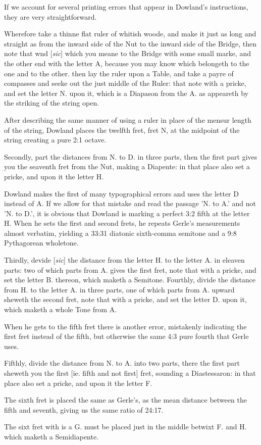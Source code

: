If we account for several printing errors that appear in Dowland's instructions, they
are very straightforward.
\begin{blocks}
Wherefore take a thinne flat ruler of whitish woode, and make it just as long and
straight as from the inward side of the Nut to the inward side of the Bridge, then note
that wnd [\textit{sic}] which you meane to the Bridge with some small marke, and the other end with
the letter A, because you may know which belongeth to the one and to the other. then
lay the ruler upon a Table, and take a payre of compasses and seeke out the just middle
of the Ruler: that note with a pricke, and set the letter N. upon it, which is a
Diapason from the A. as appeareth by the striking of the string open.
\end{blocks}
After describing the same manner of using a ruler in place of the mensur length of the
string, Dowland places the twelfth fret, fret N, at the midpoint of the string creating
a pure 2:1 octave.
\begin{blocks}
Secondly, part the distances from N. to D. in three parts, then the first part gives
you the seaventh fret from the Nut, making a Diapente: in that place also set a pricke,
and upon it the letter H.
\end{blocks}
Dowland makes the first of many typographical errors and uses the letter D instead of
A. If we allow for that mistake and read the passage 'N. to A.' and not 'N. to D.', it
is obvious that Dowland is marking a perfect 3:2 fifth at the letter H.  When he sets
the first and second frets, he repeats Gerle's measurements almost verbatim, yielding a
33:31 diatonic sixth-comma semitone and a 9:8 Pythagorean wholetone.
\begin{blocks}
Thirdly, devide [\textit{sic}] the distance from the letter H. to the letter A. in eleaven parts: two
of which parts from A. gives the first fret, note that with a pricke, and set the
letter B. thereon, which maketh a Semitone.  Fourthly, divide the distance from H. to
the letter A. in three parts, one of which parts from A. upward sheweth the second
fret, note that with a pricke, and set the letter D. upon it, which maketh a whole Tone
from A.
\end{blocks}
When he gets to the fifth fret there is another error, mistakenly indicating the first
fret instead of the fifth, but otherwise the same 4:3 pure fourth that Gerle uses.
\begin{blocks}
Fifthly, divide the distance from N. to A. into two parts, there the first part sheweth
you the first [ie. fifth and not first] fret, sounding a Diastessaron: in that place
also set a pricke, and upon it the letter F.
\end{blocks}
The sixth fret is placed the same as Gerle's, as the mean distance between the fifth and
seventh, giving us the same ratio of 24:17.
\begin{blocks}
The sixt fret with is a G. must be placed just in the middle betwixt F. and H. which
maketh a Semidiapente.
\end{blocks}

